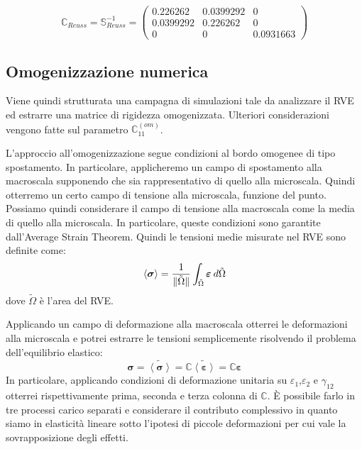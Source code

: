 \documentclass[a4paper,num-refs]{oup-contemporary}
\begin{document}
\begin{equation}
	\mathbb C_{Reuss}=\mathbb S_{Reuss}^{-1}=\begin{pmatrix}
0.226262&0.0399292&0\\
0.0399292&0.226262&0\\
0&0&0.0931663
	\end{pmatrix}
\end{equation}


\subsection{Omogenizzazione numerica}
\label{sec:homogen}

Viene quindi strutturata una campagna di simulazioni tale da analizzare il RVE ed estrarre una matrice di rigidezza omogenizzata. Ulteriori considerazioni vengono fatte sul parametro $\mathbb C_{11}^{(om)}$.

L'approccio all'omogenizzazione segue condizioni al bordo omogenee di tipo spostamento.  
In particolare, applicheremo un campo di spostamento alla macroscala supponendo che sia rappresentativo di quello alla microscala. Quindi otterremo un certo campo di tensione alla microscala, funzione del punto. Possiamo quindi considerare il campo di tensione alla macroscala come la media di quello alla microscala. In particolare, queste condizioni sono garantite dall'Average Strain Theorem.
Quindi le tensioni medie misurate nel RVE sono definite come:
\begin{equation}
	\left< \boldsymbol{\sigma}\right> ={1\over \|\tilde \Omega\|}\int _{\tilde \Omega} \boldsymbol{\varepsilon} \:d\tilde \Omega
\end{equation}
dove $\tilde \Omega$ è l'area del RVE.

Applicando un campo di deformazione alla macroscala otterrei le deformazioni alla microscala e potrei estrarre le tensioni semplicemente risolvendo il problema dell'equilibrio elastico:
\begin{equation}
\boldsymbol{\sigma}=\tilde{\left<{\boldsymbol{\sigma}}\right>}=\mathbb C\tilde{\left<{\boldsymbol{\varepsilon}}\right>}=\mathbb C \boldsymbol{\varepsilon}
\end{equation}
In particolare, applicando condizioni di deformazione unitaria su $\varepsilon_1$,$\varepsilon_2$ e $\gamma_{12}$ otterrei rispettivamente prima, seconda e terza colonna di $\mathbb C$. È possibile farlo in tre processi carico separati e considerare il contributo complessivo in quanto siamo in elasticità lineare sotto l'ipotesi di piccole deformazioni per cui vale la sovrapposizione degli effetti.
\end{document}
